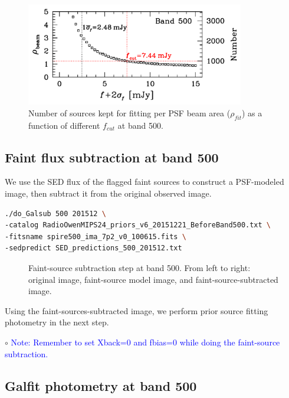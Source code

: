\documentclass[11pt,a4paper]{article}
\begin{document}
\begin{figure}[H]
	\caption{Number of sources kept for fitting per PSF beam area ($\rho_{fit}$) as a function of different $f_{cut}$ at band 500.}
	\includegraphics[width=0.85\textwidth]{plot_cutting_flux_500}
\end{figure}

\subsection{Faint flux subtraction at band 500}
\label{Band500_Galsub}

We use the SED flux of the flagged faint sources to construct a PSF-modeled image, then subtract it from the original observed image. 

\begin{lstlisting}[language=bash]
./do_Galsub 500 201512 \
-catalog RadioOwenMIPS24_priors_v6_20151221_BeforeBand500.txt \
-fitsname spire500_ima_7p2_v0_100615.fits \
-sedpredict SED_predictions_500_201512.txt
\end{lstlisting}

\begin{figure}[H]
	\caption{Faint-source subtraction step at band 500. From left to right: original image, faint-source model image, and faint-source-subtracted image.}
\end{figure}

Using the faint-sources-subtracted image, we perform prior source fitting photometry in the next step. 

\indent\hspace{15pt}$\circ$ 
\textcolor{blue}{Note: Remember to set Xback=0 and fbias=0 while doing the faint-source subtraction.}
\\

\subsection{Galfit photometry at band 500}
\label{Band500_Galfit}
\end{document}
